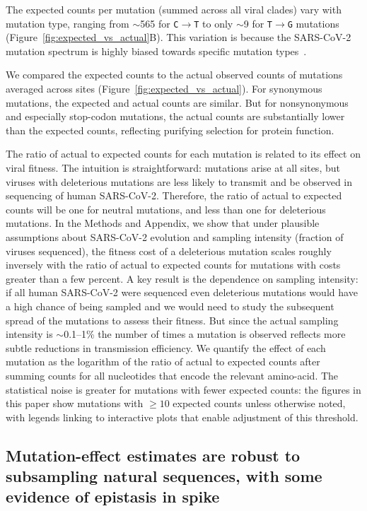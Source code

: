 \documentclass[9pt,twocolumn,twoside]{gsajnl_modified}
\begin{document}
The expected counts per mutation (summed across all viral clades) vary with mutation type, ranging from $\sim$565 for \texttt{C$\rightarrow$T} to only $\sim$9 for \texttt{T$\rightarrow$G} mutations (Figure~\ref{fig:expected_vs_actual}B).
This variation is because the SARS-CoV-2 mutation spectrum is highly biased towards specific mutation types~\citep{bloom2022evolution,ruis2022mutational,de2021mutation,neher2022contributions}.

We compared the expected counts to the actual observed counts of mutations averaged across sites (Figure~\ref{fig:expected_vs_actual}).
For synonymous mutations, the expected and actual counts are similar.
But for nonsynonymous and especially stop-codon mutations, the actual counts are substantially lower than the expected counts, reflecting purifying selection for protein function.

The ratio of actual to expected counts for each mutation is related to its effect on viral fitness.
The intuition is straightforward: mutations arise at all sites, but viruses with deleterious mutations are less likely to transmit and be observed in sequencing of human SARS-CoV-2.
Therefore, the ratio of actual to expected counts will be one for neutral mutations, and less than one for deleterious mutations.
In the Methods and Appendix, we show that under plausible assumptions about SARS-CoV-2 evolution and sampling intensity (fraction of viruses sequenced), the fitness cost of a deleterious mutation scales roughly inversely with the ratio of actual to expected counts for mutations with costs greater than a few percent.
A key result is the dependence on sampling intensity: if all human SARS-CoV-2 were sequenced even deleterious mutations would have a high chance of being sampled and we would need to study the subsequent spread of the mutations to assess their fitness.
But since the actual sampling intensity is $\sim$0.1--1\% the number of times a mutation is observed reflects more subtle reductions in transmission efficiency.
We quantify the effect of each mutation as the logarithm of the ratio of actual to expected counts after summing counts for all nucleotides that encode the relevant amino-acid.
The statistical noise is greater for mutations with fewer expected counts: the figures in this paper show mutations with $\ge10$ expected counts unless otherwise noted, with legends linking to interactive plots that enable adjustment of this threshold.

\subsection*{Mutation-effect estimates are robust to subsampling natural sequences, with some evidence of epistasis in spike}
\end{document}
